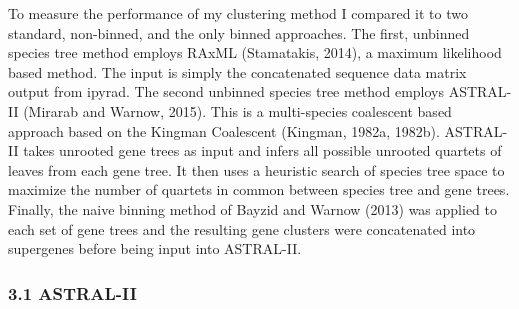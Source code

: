 \documentclass[11pt]{article}
\begin{document}
To measure the performance of my clustering method I compared it to two
standard, non-binned, and the only binned approaches. The first,
unbinned species tree method employs RAxML (Stamatakis, 2014), a maximum
likelihood based method. The input is simply the concatenated sequence
data matrix output from ipyrad. The second unbinned species tree method
employs ASTRAL-II (Mirarab and Warnow, 2015). This is a multi-species
coalescent based approach based on the Kingman Coalescent (Kingman,
1982a, 1982b). ASTRAL-II takes unrooted gene trees as input and infers
all possible unrooted quartets of leaves from each gene tree. It then
uses a heuristic search of species tree space to maximize the number of
quartets in common between species tree and gene trees. Finally, the
naive binning method of Bayzid and Warnow (2013) was applied to each set
of gene trees and the resulting gene clusters were concatenated into
supergenes before being input into ASTRAL-II.

\subsubsection{3.1 ASTRAL-II}\label{astral-ii}
\end{document}
